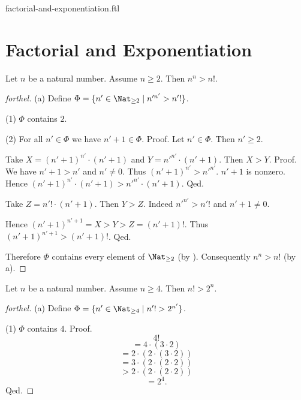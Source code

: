 \documentclass{naproche-library}
\begin{document}
\begin{smodule}{factorial-and-exponentiation.ftl}

  \section*{Factorial and Exponentiation}

  \begin{proposition}[forthel,id=ARITHMETIC_12_8113296594960384]
    Let $n$ be a natural number.
    Assume $n \geq 2$.
    Then $n^{n} > n!$.
  \end{proposition}
  \begin{proof}[forthel]
    (a) Define $\Phi = \{ n' \in \Nat_{\geq 2} \mid n'^{n'} > n'! \}$.

    (1) $\Phi$ contains $2$.

    (2) For all $n' \in \Phi$ we have $n' + 1 \in \Phi$. \newline
    Proof.
      Let $n' \in \Phi$.
      Then $n' \geq 2$.

      Take $X = (n' + 1)^{n'} \cdot (n' + 1)$ and $Y = n'^{n'} \cdot (n' + 1)$.
      Then $X > Y$. \newline
      Proof.
        We have $n' + 1 > n'$ and $n' \neq 0$.
        Thus $(n' + 1)^{n'} > n'^{n'}$.
        $n' + 1$ is nonzero.
        Hence $(n' + 1)^{n'} \cdot (n' + 1) > n'^{n'} \cdot (n' + 1)$.
      Qed.

      Take $Z = n'! \cdot (n' + 1)$.
      Then $Y > Z$.
      Indeed $n'^{n'} > n'!$ and $n' + 1 \neq 0$.

      Hence $(n' + 1)^{n' + 1} = X > Y > Z = (n' + 1)!$.
      Thus $(n' + 1)^{n' + 1} > (n' + 1)!$.
    Qed.

    Therefore $\Phi$ contains every element of $\Nat_{\geq 2}$ (by ).
    Consequently $n^{n} > n!$ (by a).
  \end{proof}

  \begin{proposition}[forthel,id=ARITHMETIC_12_5413271156817920]
    Let $n$ be a natural number.
    Assume $n \geq 4$.
    Then $n! > 2^{n}$.
  \end{proposition}
  \begin{proof}[forthel]
    (a) Define $\Phi = \{ n' \in \Nat_{\geq 4} \mid n'! > 2^{n'} \}$.

    (1) $\Phi$ contains $4$. \newline
    Proof.
      \[  4!                                  \]
      \[    = 4 \cdot (3 \cdot 2)             \]
      \[    = 2 \cdot (2 \cdot (3 \cdot 2))   \]
      \[    = 3 \cdot (2 \cdot (2 \cdot 2))   \]
      \[    > 2 \cdot (2 \cdot (2 \cdot 2))   \]
      \[    = 2^{4}.                          \]
    Qed.


\end{proof}
\end{smodule}
\end{document}

